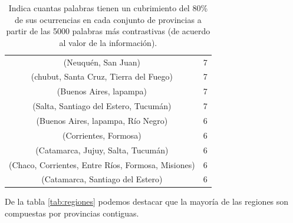 \begin{table}[]
\begin{tabular}{|c|c|}
(Neuquén, San Juan)                                    & 7           \\ %
(chubut, Santa Cruz, Tierra del Fuego)                 & 7           \\
(Buenos Aires, lapampa)                                & 7           \\
(Salta, Santiago del Estero, Tucumán)                  & 7           \\
(Buenos Aires, lapampa, Río Negro)                     & 6           \\
(Corrientes, Formosa)                                  & 6           \\
(Catamarca, Jujuy, Salta, Tucumán)                     & 6           \\
(Chaco, Corrientes, Entre Ríos, Formosa, Misiones)     & 6           \\
(Catamarca, Santiago del Estero)                       & 6           \\
\hline
\end{tabular}
\caption{Indica cuantas palabras tienen un cubrimiento del 80\% de sus ocurrencias en cada conjunto de provincias a partir de las 5000 palabras más contrastivas (de acuerdo al valor de la información).}
\end{table}

De la tabla \ref{tab:regiones} podemos destacar que la mayoría de las regiones son compuestas por provincias contiguas.

